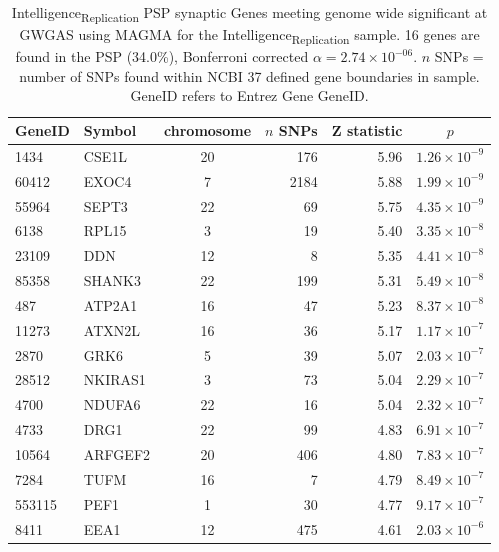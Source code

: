 \begin{table}[ht]
\centering
\begin{tabular}{llcrrc}
  \hline
 GeneID & Symbol & chromosome & $n$ SNPs & Z statistic & $p$ \\ 
  \hline
1434 & CSE1L &  20 & 176 & 5.96 & $1.26 \times 10^{-9}$ \\ 
  60412 & EXOC4 &   7 & 2184 & 5.88 & $1.99 \times 10^{-9}$ \\ 
  55964 & SEPT3 &  22 &  69 & 5.75 & $4.35 \times 10^{-9}$ \\ 
  6138 & RPL15 &   3 &  19 & 5.40 & $3.35 \times 10^{-8}$ \\ 
  23109 & DDN &  12 &   8 & 5.35 & $4.41 \times 10^{-8}$ \\ 
  85358 & SHANK3 &  22 & 199 & 5.31 & $5.49 \times 10^{-8}$ \\ 
  487 & ATP2A1 &  16 &  47 & 5.23 & $8.37 \times 10^{-8}$ \\ 
  11273 & ATXN2L &  16 &  36 & 5.17 & $1.17 \times 10^{-7}$ \\ 
  2870 & GRK6 &   5 &  39 & 5.07 & $2.03 \times 10^{-7}$ \\ 
  28512 & NKIRAS1 &   3 &  73 & 5.04 & $2.29 \times 10^{-7}$ \\ 
  4700 & NDUFA6 &  22 &  16 & 5.04 & $2.32 \times 10^{-7}$ \\ 
  
  4733 & DRG1 &  22 &  99 & 4.83 & $6.91 \times 10^{-7}$ \\ 
  10564 & ARFGEF2 &  20 & 406 & 4.80 & $7.83 \times 10^{-7}$ \\ 
  7284 & TUFM &  16 &   7 & 4.79 & $8.49 \times 10^{-7}$ \\ 
  553115 & PEF1 &   1 &  30 & 4.77 & $9.17 \times 10^{-7}$ \\ 
  8411 & EEA1 &  12 & 475 & 4.61 & $2.03 \times 10^{-6}$ \\ 
   \hline
\end{tabular}
\caption[Intelligence\textsubscript{Replication} Sample Genes in the PSP meeting genome wide significance levels for MAGMA GWGAS] { Intelligence\textsubscript{Replication} PSP synaptic Genes meeting genome wide significant at GWGAS using MAGMA for the Intelligence\textsubscript{Replication} sample. 16 genes are found in the PSP (34.0\%), Bonferroni corrected $\alpha=2.74 \times 10^{-06}$. $n$ SNPs = number of SNPs found within NCBI 37 
defined gene boundaries in sample. GeneID refers to Entrez Gene GeneID.} 
\label{tab:Significant synaptic genes in ctg MAGMA GWAS2}
\end{table}




